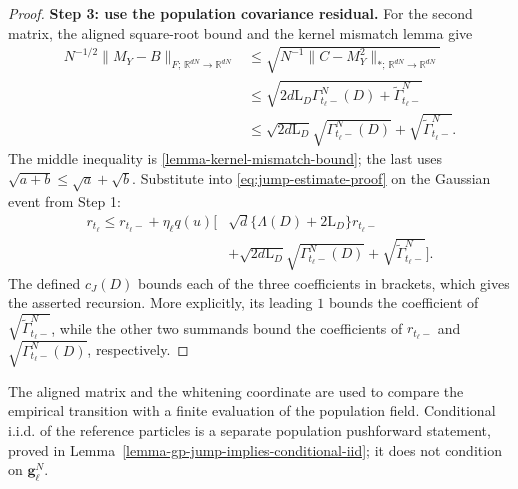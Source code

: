 \begin{proof}
\par\noindent\textbf{Step 3: use the population covariance residual.}
For the second matrix, the aligned square-root bound and the kernel mismatch
lemma give
\[
\begin{aligned}
 N^{-1/2}\|M_Y-B\|_{F;\,\mathbb R^{dN}\to\mathbb R^{dN}}
 &\le\sqrt{N^{-1}\|C-M_Y^2\|_{*;\,\mathbb R^{dN}\to\mathbb R^{dN}}}\\
 &\le\sqrt{2d\mathrm L_D\Gamma_{t_\ell-}^N(D)+\widetilde\Gamma_{t_\ell-}^N}\\
 &\le\sqrt{2d\mathrm L_D}\sqrt{\Gamma_{t_\ell-}^N(D)}
       +\sqrt{\widetilde\Gamma_{t_\ell-}^N}.
\end{aligned}
\]
The middle inequality is \cref{lemma-kernel-mismatch-bound}; the last
uses $\sqrt{a+b}\le\sqrt a+\sqrt b$. Substitute into
\eqref{eq:jump-estimate-proof} on the Gaussian event from Step 1:
\[
\begin{aligned}
 r_{t_\ell}\le r_{t_\ell-}+\eta_\ell q(u)\bigl[
 &\sqrt d\{\Lambda(D)+2\mathrm L_D\}r_{t_\ell-}\\
 &+\sqrt{2d\mathrm L_D}\sqrt{\Gamma_{t_\ell-}^N(D)}
       +\sqrt{\widetilde\Gamma_{t_\ell-}^N}\bigr].
\end{aligned}
\]
The defined $c_J(D)$ bounds each of the three coefficients in brackets,
which gives the asserted recursion. More explicitly, its leading $1$ bounds
the coefficient of $\sqrt{\widetilde\Gamma_{t_\ell-}^N}$, while the other
two summands bound the coefficients of $r_{t_\ell-}$ and
$\sqrt{\Gamma_{t_\ell-}^N(D)}$, respectively.
\end{proof}
\begin{remark}
The aligned matrix and the whitening coordinate are used to compare the
empirical transition with a finite evaluation of the population field.
Conditional i.i.d. of the reference particles is a separate population
pushforward statement, proved in
Lemma~\ref{lemma-gp-jump-implies-conditional-iid}; it does not condition on
$\mathbf g_\ell^N$.
\end{remark}

